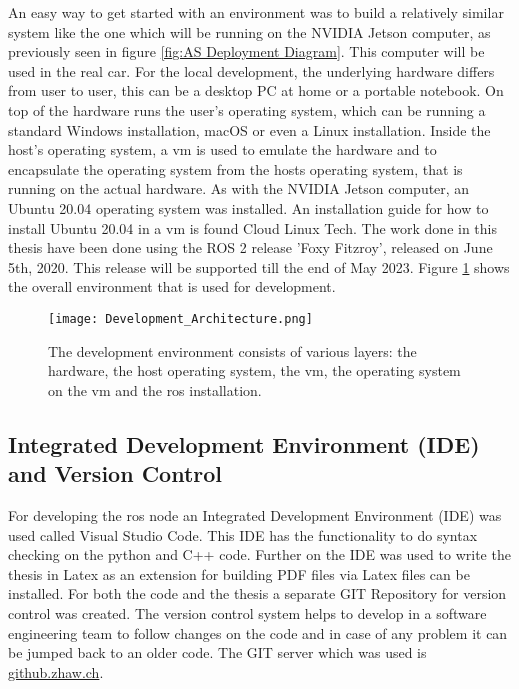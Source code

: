 An easy way to get started with an environment was to build a relatively similar system like the one which will be running on the NVIDIA Jetson computer, as previously seen in figure \ref{fig:AS Deployment Diagram}. This computer will be used in the real car.
For the local development, the underlying hardware differs from user to user, this can be a desktop PC at home or a portable notebook. On top of the hardware runs the user's operating system, which can be running a standard Windows installation, macOS or even a Linux installation. Inside the host's operating system, a \acrlong{vm} is used to emulate the hardware and to encapsulate the operating system from the hosts operating system, that is running on the actual hardware. As with the NVIDIA Jetson computer, an Ubuntu 20.04 operating system was installed. An installation guide for how to install Ubuntu 20.04 in a \acrshort{vm} is found Cloud Linux Tech. \cite{cloudlinuxtech_install_ubuntu_2004} The work done in this thesis have been done using the ROS 2 release 'Foxy Fitzroy', released on June 5th, 2020. This release will be supported till the end of May 2023. \cite{ros2_releases_and_target_platforms}
Figure \ref{fig:Development Environment} shows the overall environment that is used for development.
\begin{figure}[H]
    \centering
    \texttt{[image: Development\_Architecture.png]}
    \caption{The development environment consists of various layers: the hardware, the host operating system, the \acrshort{vm}, the operating system on the \acrshort{vm} and the \acrshort{ros} installation.}
    \label{fig:Development Environment}
\end{figure}

\subsection{Integrated Development Environment (IDE) and Version Control} \label{sec:Integrated Development Environment (IDE) and Version Control}
For developing the \acrshort{ros} node an Integrated Development Environment (IDE) was used called Visual Studio Code. This IDE has the functionality to do syntax checking on the python and C++ code. Further on the IDE was used to write the thesis in Latex as an extension for building PDF files via Latex files can be installed. For both the code and the thesis a separate GIT Repository for version control was created. The version control system helps to develop in a software engineering team to follow changes on the code and in case of any problem it can be jumped back to an older code. The GIT server which was used is \href{https://github.zhaw.ch}{github.zhaw.ch}.


